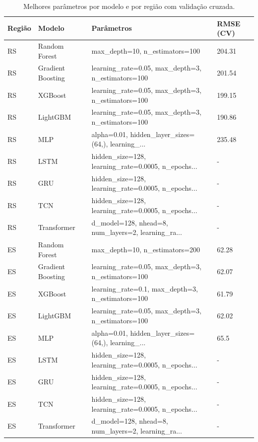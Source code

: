 \begin{table}
\centering
\caption{Melhores parâmetros por modelo e por região com validação cruzada.}
\label{tab:parametros_otimizados_regionais}
\begin{tabular}{llll}
\toprule
Região &            Modelo &                                         Parâmetros & RMSE (CV) \\
\midrule
    RS &     Random Forest &                     max_depth=10, n_estimators=100 &    204.31 \\
    RS & Gradient Boosting &  learning_rate=0.05, max_depth=3, n_estimators=100 &    201.54 \\
    RS &           XGBoost &  learning_rate=0.05, max_depth=3, n_estimators=100 &    199.15 \\
    RS &          LightGBM &  learning_rate=0.05, max_depth=3, n_estimators=100 &    190.86 \\
    RS &               MLP & alpha=0.01, hidden_layer_sizes=(64,), learning_... &    235.48 \\
    RS &              LSTM & hidden_size=128, learning_rate=0.0005, n_epochs... &         - \\
    RS &               GRU & hidden_size=128, learning_rate=0.0005, n_epochs... &         - \\
    RS &               TCN & hidden_size=128, learning_rate=0.0005, n_epochs... &         - \\
    RS &       Transformer & d_model=128, nhead=8, num_layers=2, learning_ra... &         - \\
    ES &     Random Forest &                     max_depth=10, n_estimators=200 &     62.28 \\
    ES & Gradient Boosting &  learning_rate=0.05, max_depth=3, n_estimators=100 &     62.07 \\
    ES &           XGBoost &   learning_rate=0.1, max_depth=3, n_estimators=100 &     61.79 \\
    ES &          LightGBM &  learning_rate=0.05, max_depth=3, n_estimators=100 &     62.02 \\
    ES &               MLP & alpha=0.01, hidden_layer_sizes=(64,), learning_... &      65.5 \\
    ES &              LSTM & hidden_size=128, learning_rate=0.0005, n_epochs... &         - \\
    ES &               GRU & hidden_size=128, learning_rate=0.0005, n_epochs... &         - \\
    ES &               TCN & hidden_size=128, learning_rate=0.0005, n_epochs... &         - \\
    ES &       Transformer & d_model=128, nhead=8, num_layers=2, learning_ra... &         - \\
\bottomrule
\end{tabular}
\end{table}
